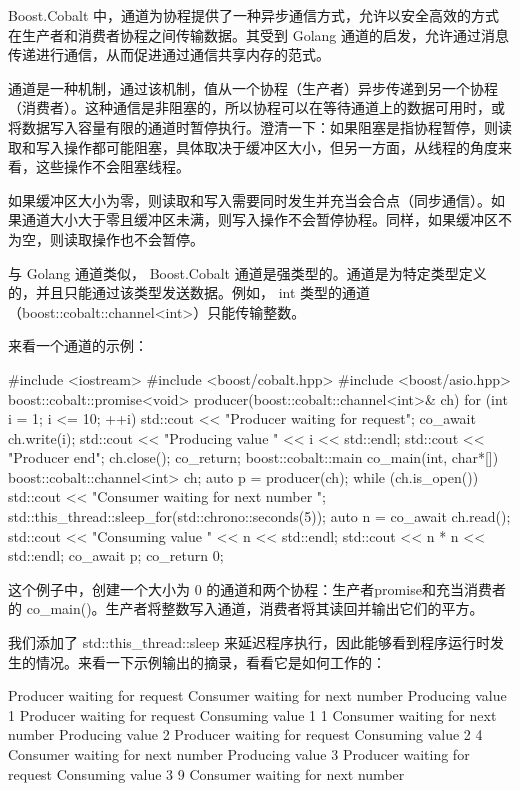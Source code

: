 Boost.Cobalt 中，通道为协程提供了一种异步通信方式，允许以安全高效的方式在生产者和消费者协程之间传输数据。其受到 Golang 通道的启发，允许通过消息传递进行通信，从而促进通过通信共享内存的范式。

通道是一种机制，通过该机制，值从一个协程（生产者）异步传递到另一个协程（消费者）。这种通信是非阻塞的，所以协程可以在等待通道上的数据可用时，或将数据写入容量有限的通道时暂停执行。澄清一下：如果阻塞是指协程暂停，则读取和写入操作都可能阻塞，具体取决于缓冲区大小，但另一方面，从线程的角度来看，这些操作不会阻塞线程。

如果缓冲区大小为零，则读取和写入需要同时发生并充当会合点（同步通信）。如果通道大小大于零且缓冲区未满，则写入操作不会暂停协程。同样，如果缓冲区不为空，则读取操作也不会暂停。

与 Golang 通道类似， Boost.Cobalt 通道是强类型的。通道是为特定类型定义的，并且只能通过该类型发送数据。例如， int 类型的通道（boost::cobalt::channel<int>）只能传输整数。

来看一个通道的示例：

\begin{cpp}
#include <iostream>
#include <boost/cobalt.hpp>
#include <boost/asio.hpp>
boost::cobalt::promise<void> producer(boost::cobalt::channel<int>& ch)
{
    for (int i = 1; i <= 10; ++i) {
        std::cout << "Producer waiting for request\n";
        co_await ch.write(i);
        std::cout << "Producing value " << i << std::endl;
    }
    std::cout << "Producer end\n";
    ch.close();
    co_return;
}
boost::cobalt::main co_main(int, char*[]) {
    boost::cobalt::channel<int> ch;
    auto p = producer(ch);
    while (ch.is_open()) {
        std::cout << "Consumer waiting for next number \n";
        std::this_thread::sleep_for(std::chrono::seconds(5));
        auto n = co_await ch.read();
        std::cout << "Consuming value " << n << std::endl;
        std::cout << n * n << std::endl;
    }
    co_await p;
    co_return 0;
}
\end{cpp}

这个例子中，创建一个大小为 0 的通道和两个协程：生产者promise和充当消费者的 co\_main()。生产者将整数写入通道，消费者将其读回并输出它们的平方。

我们添加了 std::this\_thread::sleep 来延迟程序执行，因此能够看到程序运行时发生的情况。来看一下示例输出的摘录，看看它是如何工作的：

\begin{shell}
Producer waiting for request
Consumer waiting for next number
Producing value 1
Producer waiting for request
Consuming value 1
1
Consumer waiting for next number
Producing value 2
Producer waiting for request
Consuming value 2
4
Consumer waiting for next number
Producing value 3
Producer waiting for request
Consuming value 3
9
Consumer waiting for next number
\end{shell}

